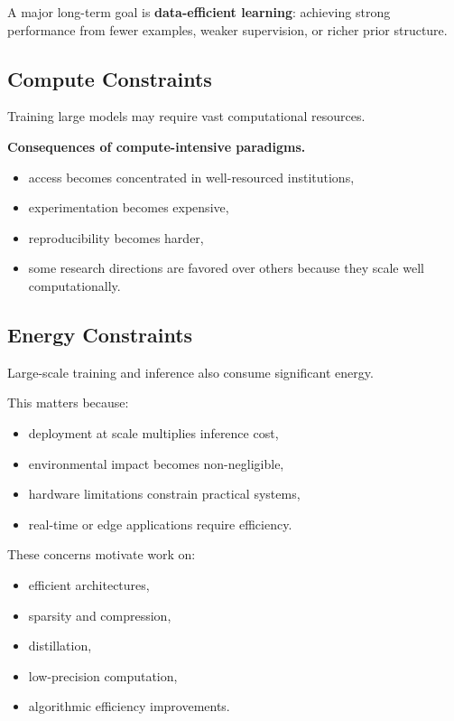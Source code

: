 \medskip

\noindent
A major long-term goal is \textbf{data-efficient learning}: achieving strong performance from fewer examples, weaker supervision, or richer prior structure.

\subsection{Compute Constraints}

Training large models may require vast computational resources.

\medskip

\noindent
\textbf{Consequences of compute-intensive paradigms.}
\begin{itemize}
    \item access becomes concentrated in well-resourced institutions,
    \item experimentation becomes expensive,
    \item reproducibility becomes harder,
    \item some research directions are favored over others because they scale well computationally.
\end{itemize}

\subsection{Energy Constraints}

Large-scale training and inference also consume significant energy.

\medskip

\noindent
This matters because:
\begin{itemize}
    \item deployment at scale multiplies inference cost,
    \item environmental impact becomes non-negligible,
    \item hardware limitations constrain practical systems,
    \item real-time or edge applications require efficiency.
\end{itemize}

\medskip

\noindent
These concerns motivate work on:
\begin{itemize}
    \item efficient architectures,
    \item sparsity and compression,
    \item distillation,
    \item low-precision computation,
    \item algorithmic efficiency improvements.
\end{itemize}

